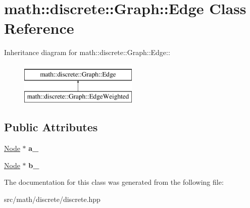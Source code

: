 \hypertarget{classmath_1_1discrete_1_1Graph_1_1Edge}{
\section{math::discrete::Graph::Edge Class Reference}
\label{classmath_1_1discrete_1_1Graph_1_1Edge}
}
Inheritance diagram for math::discrete::Graph::Edge::\begin{figure}[H]
\begin{center}
\leavevmode
\includegraphics[height=2cm]{classmath_1_1discrete_1_1Graph_1_1Edge}
\end{center}
\end{figure}
\subsection*{Public Attributes}
\begin{DoxyCompactItemize}
\item 
\hypertarget{classmath_1_1discrete_1_1Graph_1_1Edge_a94989ea7055849b7a9e85f33f271ff84}{
\hyperlink{classmath_1_1discrete_1_1Graph_1_1Node}{Node} $\ast$ {\bfseries a\_\-}}
\label{classmath_1_1discrete_1_1Graph_1_1Edge_a94989ea7055849b7a9e85f33f271ff84}

\item 
\hypertarget{classmath_1_1discrete_1_1Graph_1_1Edge_aefa7104cfdbcd7c0e4bb66fd68c4634c}{
\hyperlink{classmath_1_1discrete_1_1Graph_1_1Node}{Node} $\ast$ {\bfseries b\_\-}}
\label{classmath_1_1discrete_1_1Graph_1_1Edge_aefa7104cfdbcd7c0e4bb66fd68c4634c}

\end{DoxyCompactItemize}


The documentation for this class was generated from the following file:\begin{DoxyCompactItemize}
\item 
src/math/discrete/discrete.hpp\end{DoxyCompactItemize}
